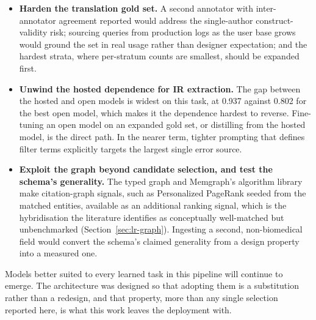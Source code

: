 \begin{itemize}
  \item \textbf{Harden the translation gold set.} A second annotator with inter-annotator agreement reported would address the single-author construct-validity risk; sourcing queries from production logs as the user base grows would ground the set in real usage rather than designer expectation; and the hardest strata, where per-stratum counts are smallest, should be expanded first.

  \item \textbf{Unwind the hosted dependence for IR extraction.} The gap between the hosted and open models is widest on this task, at 0.937 against 0.802 for the best open model, which makes it the dependence hardest to reverse. Fine-tuning an open model on an expanded gold set, or distilling from the hosted model, is the direct path. In the nearer term, tighter prompting that defines filter terms explicitly targets the largest single error source.

  \item \textbf{Exploit the graph beyond candidate selection, and test the schema's generality.} The typed graph and Memgraph's algorithm library make citation-graph signals, such as Personalized PageRank seeded from the matched entities, available as an additional ranking signal, which is the hybridisation the literature identifies as conceptually well-matched but unbenchmarked (Section~\ref{sec:lr-graph}). Ingesting a second, non-biomedical field would convert the schema's claimed generality from a design property into a measured one.
\end{itemize}

Models better suited to every learned task in this pipeline will continue to emerge. The architecture was designed so that adopting them is a substitution rather than a redesign, and that property, more than any single selection reported here, is what this work leaves the deployment with.